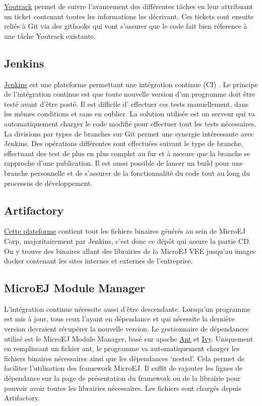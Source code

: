 \documentclass[french,a4paper,12pt]{report}
\begin{document}
\href{https://www.jetbrains.com/youtrack/}{Youtrack} permet de suivre l'avancement des différentes tâches en leur attribuant un ticket contenant toutes les informations les décrivant.
Ces tickets sont ensuite reliés à Git via des githooks qui vont s'assurer que le code fait bien réference à une tâche Youtrack existante.

\subsection{Jenkins}

\href{https://www.jenkins.io/}{Jenkins} est une plateforme permettant une intégration continue (CI) . Le principe de l’intégration continue est que toute nouvelle version d’un programme doit être testé avant d’être posté. Il est difficile d' effectuer ces tests manuellement, dans les mêmes conditions et sans en oublier. La solution utilisée est un serveur qui va automatiquement charger le code modifié pour effectuer tout les tests nécessaires. La divisions par types de branches sur Git permet une synergie intéressante avec Jenkins. Des opérations différentes sont effectuées suivant le type de branche, effectuant des test de plus en plus complet au fur et à mesure que la branche se rapproche d'une publication. Il est aussi possible de lancer un build pour une branche personnelle et de s’assurer de la fonctionnalité du code tout au long du processus de développement.

\subsection{Artifactory}

\href{https://www.jfrog.com/}{Cette plateforme} contient tout les fichiers binaires générés au sein de MicroEJ Corp, majoritairement par Jenkins, c'est donc ce dépôt qui assure la partie CD. On y trouve des binaires allant des librairies de la MicroEJ VEE jusqu'au images docker contenant les sites internes et externes de l'entreprise.

\subsection{MicroEJ Module Manager}
L’intégration continue nécessite aussi d'être descendante. Lorsqu'un programme est mis à jour, tous ceux l'ayant en dépendance et qui nécessite la dernière version devraient récupérer la nouvelle version.
Le gestionnaire de dépendances utilisé est le MicroEJ Module Manager, basé sur apache \href{https://ant.apache.org/}{Ant} et \href{https://ant.apache.org/ivy/}{Ivy}. Uniquement en remplissant un fichier ant, le programme va automatiquement charger les fichiers binaires nécessaires ainsi que les dépendances ‘nested’. Cela permet de faciliter l’utilisation des framework MicroEJ. Il suffit de rajouter les lignes de dépendance sur la page de présentation du framework ou de la librairie pour pouvoir avoir toutes les librairies nécessaires. Les fichiers sont chargés depuis Artifactory.
\end{document}
